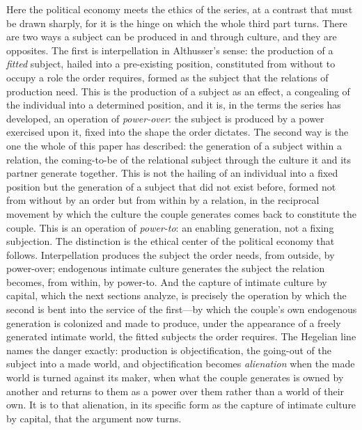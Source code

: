 Here the political economy meets the ethics of the series, at a contrast that must be drawn sharply, for it is the hinge on which the whole third part turns. There are two ways a subject can be produced in and through culture, and they are opposites. The first is interpellation in Althusser's sense: the production of a \emph{fitted} subject, hailed into a pre-existing position, constituted from without to occupy a role the order requires, formed as the subject that the relations of production need. This is the production of a subject as an effect, a congealing of the individual into a determined position, and it is, in the terms the series has developed, an operation of \emph{power-over}: the subject is produced by a power exercised upon it, fixed into the shape the order dictates. The second way is the one the whole of this paper has described: the generation of a subject within a relation, the coming-to-be of the relational subject through the culture it and its partner generate together. This is not the hailing of an individual into a fixed position but the generation of a subject that did not exist before, formed not from without by an order but from within by a relation, in the reciprocal movement by which the culture the couple generates comes back to constitute the couple. This is an operation of \emph{power-to}: an enabling generation, not a fixing subjection. The distinction is the ethical center of the political economy that follows. Interpellation produces the subject the order needs, from outside, by power-over; endogenous intimate culture generates the subject the relation becomes, from within, by power-to. And the capture of intimate culture by capital, which the next sections analyze, is precisely the operation by which the second is bent into the service of the first---by which the couple's own endogenous generation is colonized and made to produce, under the appearance of a freely generated intimate world, the fitted subjects the order requires. The Hegelian line names the danger exactly: production is objectification, the going-out of the subject into a made world, and objectification becomes \emph{alienation} when the made world is turned against its maker, when what the couple generates is owned by another and returns to them as a power over them rather than a world of their own. It is to that alienation, in its specific form as the capture of intimate culture by capital, that the argument now turns.
